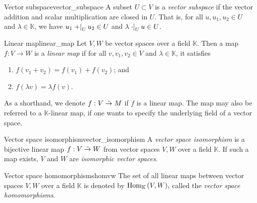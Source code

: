 \begin{definition}{Vector subspace}{vector_subspace}
    A subset \(U \subset V\) is a \emph{vector subspace} if the vector addition and scalar multiplication are closed in \(U\). That is, for all \(u, u_1, u_2 \in U\) and \(\lambda \in \mathbb{K}\), we have \(u_1 \restrict{+}{U} u_2 \in U\) and \(\lambda \restrict{\cdot}{U} u \in U\).
\end{definition}

\begin{definition}{Linear map}{linear_map}
    Let \(V, W\) be vector spaces over a field \(\mathbb{K}\). Then a map \(f : V \to W\) is a \emph{linear map} if for all \(v, v_1, v_2 \in V\) and \(\lambda\in \mathbb{K}\), it satisfies
    \begin{enumerate}[label=(\alph*)]
        \item \(f(v_1 + v_2) = f(v_1) + f(v_2)\); and
        \item \(f(\lambda v) = \lambda f(v)\).
    \end{enumerate}
    As a shorthand, we denote \(f : V \linear M\) if \(f\) is a linear map. The map may also be referred to a \(\mathbb{K}\)-linear map, if one wants to specify the underlying field of a vector space.
\end{definition}
\begin{definition}{Vector space isomorphism}{vector_isomorphism}
    A \emph{vector space isomorphism} is a bijective linear map \(f : V \linear W\) from vector spaces \(V, W\) over a field \(\mathbb{K}\). If such a map exists, \(V\) and \(W\) are \emph{isomorphic vector spaces}.
\end{definition}

\begin{definition}{Vector space homomorphisms}{homvw}
    The set of all linear maps between vector spaces \(V, W\) over a field \(\mathbb{K}\) is denoted by \(\Hom[\mathbb{K}]{V,W},\) called the \emph{vector space homomorphisms}.
\end{definition}

